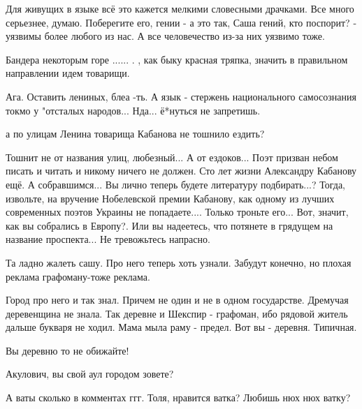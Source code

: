 \begin{itemize}
Для живущих в языке всё это кажется мелкими словесными драчками. Все много
серьезнее, думаю. Поберегите его, гении - а это так, Саша гений, кто поспорит?
- уязвимы более любого из нас. А все человечество из-за них уязвимо тоже.


Бандера некоторым горе ...... . , как быку красная тряпка, значить в правильном
направлении идем товарищи.


Ага. Оставить лениных, блеа -ть. А язык - стержень национального самосознания
токмо у "отсталых народов... Нда... ё*нуться не запретишь.


а по улицам Ленина товарища Кабанова не тошнило ездить?


Тошнит не от названия улиц, любезный... А от ездоков... Поэт призван небом
писать и читать и никому ничего не должен. Сто лет жизни Александру Кабанову
ещё. А собравшимся... Вы лично теперь будете литературу подбирать...? Тогда,
извольте, на вручение Нобелевской премии Кабанову, как одному из лучших
современных поэтов Украины не попадаете.... Только троньте его... Вот, значит,
как вы собрались в Европу?. Или вы надеетесь, что потянете в грядущем на
название проспекта... Не тревожьтесь напрасно.


Та ладно жалеть сашу. Про него теперь хоть узнали. Забудут конечно, но плохая
реклама графоману-тоже реклама.

\begin{itemize} %

Город про него и так знал. Причем не один и не в одном государстве. Дремучая
деревенщина не знала. Так деревне и Шекспир - графоман, ибо рядовой житель
дальше букваря не ходил. Мама мыла раму - предел. Вот вы - деревня. Типичная.

Вы деревню то не обижайте!

Акулович, вы свой аул городом зовете?
\end{itemize} %


А ваты сколько в комментах ггг. Толя, нравится ватка? Любишь нюх нюх ватку?

\begin{itemize} %


\end{itemize}
\end{itemize}
